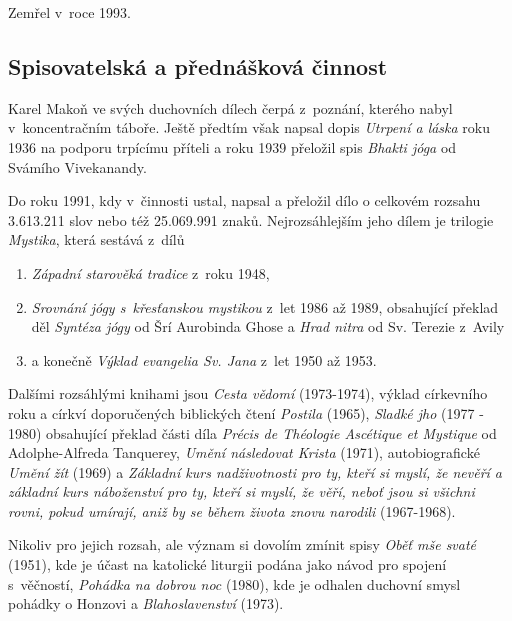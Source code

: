 Zemřel v~roce 1993.

\subsection{Spisovatelská a přednášková činnost}

Karel Makoň ve svých duchovních dílech čerpá z~poznání, kterého nabyl
v~koncentračním táboře. Ještě předtím však napsal dopis {\em Utrpení a láska}
roku 1936 na podporu trpícímu příteli a roku 1939 přeložil spis {\em Bhakti
jóga}\cite{vivekananda2003bhakti} od Svámího Vivekanandy.

Do roku 1991, kdy v~činnosti ustal, napsal a přeložil dílo o celkovém rozsahu
3.613.211 slov nebo též 25.069.991 znaků. Nejrozsáhlejším jeho dílem je trilogie
{\em Mystika}, která sestává z~dílů
\begin{enumerate}
\item{{\em Západní starověká tradice} z~roku 1948,}
\item{
    {\em Srovnání jógy s~křesťanskou mystikou}
    z~let 1986 až 1989, obsahující překlad děl
    {\em Syntéza jógy}\cite{aurobindo1999synthesis} od Šrí Aurobinda Ghose
    a {\em Hrad nitra}\cite{teresa1588castillo} od Sv. Terezie z~Avily
}
\item{a konečně {\em Výklad evangelia Sv. Jana} z~let 1950 až 1953.}
\end{enumerate}

Dalšími rozsáhlými knihami jsou {\em Cesta vědomí} (1973-1974),
výklad církevního roku a církví doporučených biblických čtení
{\em Postila} (1965),
{\em Sladké jho} (1977 - 1980) obsahující překlad části díla
{\em Précis de Théologie Ascétique et Mystique}
od Adolphe-Alfreda Tanquerey,
{\em Umění následovat Krista} (1971),
autobiografické {\em Umění žít} (1969)
a {\em Základní kurs nadživotnosti pro ty, kteří si myslí, že nevěří a základní
kurs náboženství pro ty, kteří si myslí, že věří, neboť jsou si všichni rovni,
pokud umírají, aniž by se během života znovu narodili} (1967-1968).

Nikoliv pro jejich rozsah, ale význam si dovolím zmínit spisy
{\em Oběť mše svaté} (1951), kde je účast na katolické liturgii podána jako
návod pro spojení s~věčností,
{\em Pohádka na dobrou noc} (1980), kde je odhalen duchovní smysl pohádky o
Honzovi
a {\em Blahoslavenství} (1973).

